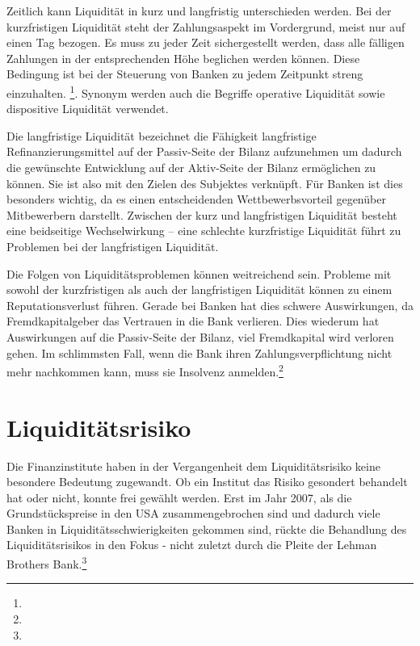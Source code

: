 \begin{onehalfspacing}
Zeitlich kann Liquidität in kurz und langfristig unterschieden werden. Bei der kurzfristigen Liquidität steht der Zahlungsaspekt im Vordergrund, meist nur auf einen Tag bezogen. Es muss zu jeder Zeit sichergestellt werden, dass alle fälligen Zahlungen in der entsprechenden Höhe beglichen werden können. Diese Bedingung ist bei der Steuerung von Banken zu jedem Zeitpunkt streng einzuhalten. \footnote{ }. Synonym werden auch die Begriffe operative Liquidität sowie dispositive Liquidität verwendet.

Die langfristige Liquidität bezeichnet die Fähigkeit langfristige Refinanzierungsmittel auf der Passiv-Seite der Bilanz aufzunehmen um dadurch die gewünschte Entwicklung auf der Aktiv-Seite der Bilanz ermöglichen zu können. Sie ist also mit den Zielen des Subjektes verknüpft. Für Banken ist dies besonders wichtig, da es einen entscheidenden Wettbewerbsvorteil gegenüber Mitbewerbern darstellt. Zwischen der kurz und langfristigen Liquidität besteht eine beidseitige Wechselwirkung -- eine schlechte kurzfristige Liquidität führt zu Problemen bei der langfristigen Liquidität.

Die Folgen von Liquiditätsproblemen können weitreichend sein. Probleme mit sowohl der kurzfristigen als auch der langfristigen Liquidität können zu einem Reputationsverlust führen. Gerade bei Banken hat dies schwere Auswirkungen, da Fremdkapitalgeber das Vertrauen in die Bank verlieren. Dies wiederum hat Auswirkungen auf die Passiv-Seite der Bilanz, viel Fremdkapital wird verloren gehen. Im schlimmsten Fall, wenn die Bank ihren Zahlungsverpflichtung nicht mehr nachkommen kann, muss sie Insolvenz anmelden.\footnote{ }

\section{Liquiditätsrisiko}
Die Finanzinstitute haben in der Vergangenheit dem Liquiditätsrisiko keine besondere Bedeutung zugewandt. Ob ein Institut das Risiko gesondert behandelt hat oder nicht, konnte frei gewählt werden. Erst im Jahr 2007, als die Grundstückspreise in den USA zusammengebrochen sind und dadurch viele Banken in Liquiditätsschwierigkeiten gekommen sind, rückte die Behandlung des Liquiditätsrisikos in den Fokus - nicht zuletzt durch die Pleite der Lehman Brothers Bank.\footnote{ }



\end{onehalfspacing}
